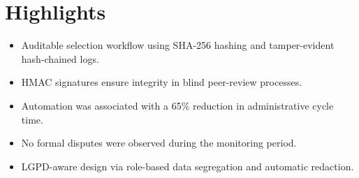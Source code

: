 \documentclass[12pt]{article}
\begin{document}
\section*{Highlights}
\begin{itemize}
    \item Auditable selection workflow using SHA-256 hashing and tamper-evident hash-chained logs.
    \item HMAC signatures ensure integrity in blind peer-review processes.
    \item Automation was associated with a 65\% reduction in administrative cycle time.
    \item No formal disputes were observed during the monitoring period.
    \item LGPD-aware design via role-based data segregation and automatic redaction.
\end{itemize}
\end{document}
